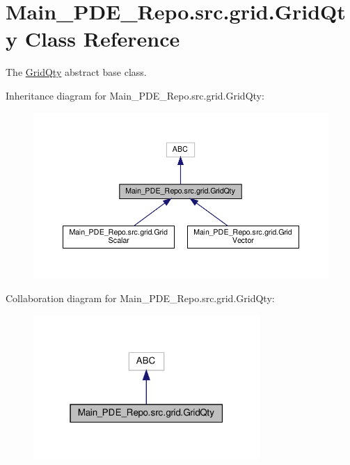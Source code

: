 \hypertarget{classMain__PDE__Repo_1_1src_1_1grid_1_1GridQty}{}\section{Main\+\_\+\+P\+D\+E\+\_\+\+Repo.\+src.\+grid.\+Grid\+Qty Class Reference}
\label{classMain__PDE__Repo_1_1src_1_1grid_1_1GridQty}


The \hyperlink{classMain__PDE__Repo_1_1src_1_1grid_1_1GridQty}{Grid\+Qty} abstract base class.  




Inheritance diagram for Main\+\_\+\+P\+D\+E\+\_\+\+Repo.\+src.\+grid.\+Grid\+Qty\+:
\nopagebreak
\begin{figure}[H]
\begin{center}
\leavevmode
\includegraphics[width=350pt]{classMain__PDE__Repo_1_1src_1_1grid_1_1GridQty__inherit__graph}
\end{center}
\end{figure}


Collaboration diagram for Main\+\_\+\+P\+D\+E\+\_\+\+Repo.\+src.\+grid.\+Grid\+Qty\+:
\nopagebreak
\begin{figure}[H]
\begin{center}
\leavevmode
\includegraphics[width=244pt]{classMain__PDE__Repo_1_1src_1_1grid_1_1GridQty__coll__graph}
\end{center}
\end{figure}
